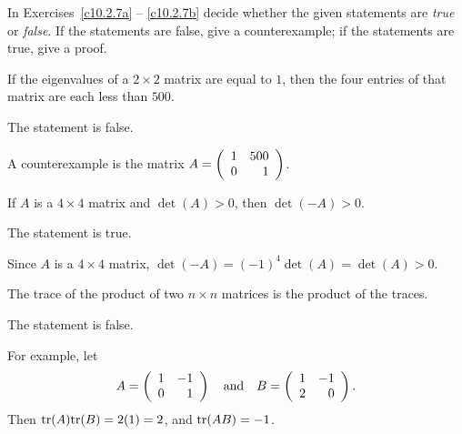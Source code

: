 \documentclass{ximera}
\begin{document}
\noindent In Exercises~\ref{c10.2.7a} -- \ref{c10.2.7b} decide whether 
the given statements are {\em true\/} or {\em false\/}. If the 
statements are false, give a counterexample; if the statements are true, 
give a proof.
\begin{exercise} \label{c10.2.7a}
If the eigenvalues of a $2\times 2$ matrix are equal to $1$,
then the four entries of that matrix are each less than $500$.

\begin{solution}

\ans The statement is false. 

\soln  A counterexample is the matrix $A = \left(\begin{array}{rr} 1 & 500\\ 0 &1\end{array}\right)$.

\end{solution}
\end{exercise}

\begin{exercise} \label{c10.2.7ab}
If $A$ is a $4\times 4$ matrix and $\det(A)>0$, then $\det(-A)>0$. 

\begin{solution}
\ans The statement is true.

\soln Since $A$ is a $4\times 4$ matrix, $\det(-A) = (-1)^4\det(A)=\det(A)>0$. 
\end{solution}
\end{exercise}

\begin{exercise} \label{c10.2.7b}
The trace of the product of two $n\times n$ matrices is the
product of the traces.

\begin{solution}
\ans The statement is false.

\soln For example, let
\[
A = \left(\begin{array}{rr} 1 & -1\\ 0 &1\end{array}\right) \quad\mbox{and}\quad B = \left(\begin{array}{rr} 1 & -1\\ 2 &0\end{array}\right).
\]
Then ${\rm tr}(A){\rm tr}(B) = 2(1) = 2$, and ${\rm tr}(AB) = -1$.

\end{solution}
\end{exercise}
\end{document}

